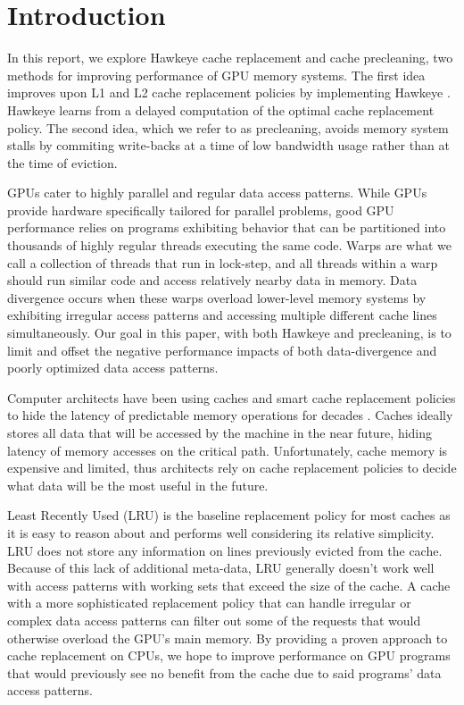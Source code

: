 \chapter{Introduction}

In this report, we explore Hawkeye cache replacement and cache precleaning, two methods for improving performance of GPU memory systems. The first idea improves upon L1 and L2 cache replacement policies by implementing Hawkeye \cite{hawkeye}. Hawkeye learns from a delayed computation of the optimal cache replacement policy. The second idea, which we refer to as precleaning, avoids memory system stalls by commiting write-backs at a time of low bandwidth usage rather than at the time of eviction.

GPUs cater to highly parallel and regular data access patterns. While GPUs provide hardware specifically tailored for parallel problems, good GPU performance relies on programs exhibiting behavior that can be partitioned into thousands of highly regular threads executing the same code. Warps are what we call a collection of threads that run in lock-step, and all threads within a warp should run similar code and access relatively nearby data in memory. Data divergence occurs when these warps overload lower-level memory systems by exhibiting irregular access patterns and accessing multiple different cache lines simultaneously. Our goal in this paper, with both Hawkeye and precleaning, is to limit and offset the negative performance impacts of both data-divergence and poorly optimized data access patterns.

Computer architects have been using caches and smart cache replacement policies to hide the latency of predictable memory operations for decades \cite{deadblock,lruperf,cache_burst,dip,eva,rrip}. Caches ideally stores all data that will be accessed by the machine in the near future, hiding latency of memory accesses on the critical path. Unfortunately, cache memory is expensive and limited, thus architects rely on cache replacement policies to decide what data will be the most useful in the future.

Least Recently Used (LRU) is the baseline replacement policy for most caches as it is easy to reason about and performs well considering its relative simplicity. LRU does not store any information on lines previously evicted from the cache. Because of this lack of additional meta-data, LRU generally doesn't work well with access patterns with working sets that exceed the size of the cache. A cache with a more sophisticated replacement policy that can handle irregular or complex data access patterns can filter out some of the requests that would otherwise overload the GPU's main memory. By providing a proven approach to cache replacement on CPUs, we hope to improve performance on GPU programs that would previously see no benefit from the cache due to said programs’ data access patterns.

